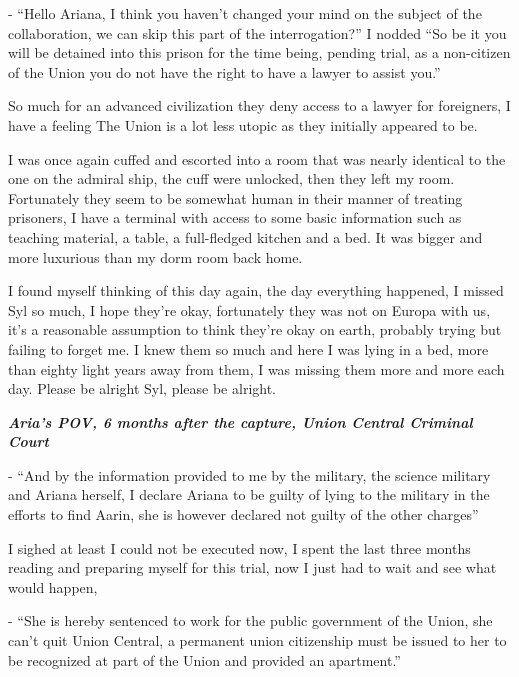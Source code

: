 \documentclass[colorlinks,12pt,a4paper]{book}
\begin{document}
- “Hello Ariana, I think you haven't changed your mind on the subject of the collaboration, we can skip this 
part of the interrogation?” I nodded “So be it you will be detained into this prison for the time being, pending trial, as a non-citizen of the Union you do not have the right to 
have a lawyer to assist you.”\par
\bigskip

So much for an advanced civilization they deny access to a lawyer for foreigners, I have a feeling The Union is a lot 
less utopic as they initially appeared to be.\par
\bigskip

I was once again cuffed and escorted into a room that was nearly identical to the one on the admiral ship, the cuff 
were unlocked, then they left my room. Fortunately they seem to be somewhat human in their manner of treating prisoners,
 I have a terminal with access to some basic information such as teaching material, a table, a full-fledged kitchen and 
 a bed. It was bigger and more luxurious than my dorm room back home. \par
 \bigskip

I found myself thinking of this day again, the day everything happened, I missed Syl so much, I hope they're okay, 
fortunately they was not on Europa with us, it's a reasonable assumption to think they're okay on earth, probably 
trying but failing to forget me. I knew them so much and here I was lying in a bed, more than eighty light years away 
from them, I was missing them more and more each day. Please be alright Syl, please be alright.\par
\bigskip

\textit{\textbf{Aria's POV, 6 months after the capture, Union Central Criminal Court}}\par
\bigskip

- “And by the information provided to me by the military, the science military and Ariana herself, I declare Ariana to 
be guilty of lying to the military in the efforts to find Aarin, she is however declared not guilty of the other charges”\par
\bigskip

I sighed at least I could not be executed now, I spent the last three months reading and preparing myself for this trial, 
now I just had to wait and see what would happen,\par
\bigskip

- “She is hereby sentenced to work for the public government of the Union, she can't quit Union Central, a permanent union 
citizenship must be issued to her to be recognized at part of the Union and provided an apartment.”\par
\bigskip
\end{document}
